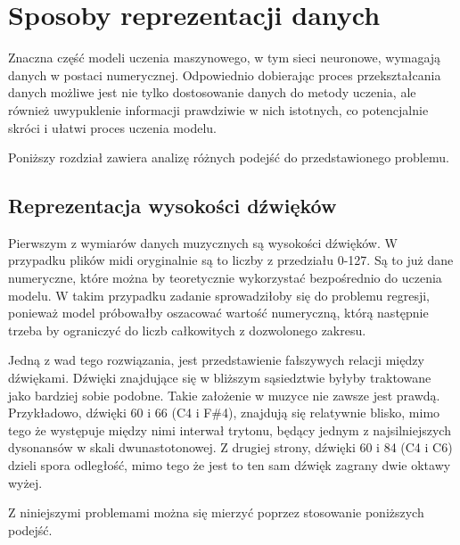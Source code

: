 \chapter{Sposoby reprezentacji danych}\label{chap:representation}
{
    Znaczna część modeli uczenia maszynowego, w\,\,tym sieci neuronowe, wymagają 
    danych w\,\,postaci numerycznej. Odpowiednio dobierając proces przekształcania danych
    możliwe jest nie tylko dostosowanie danych do metody uczenia, ale również
    uwypuklenie informacji prawdziwie w\,\,nich istotnych, co potencjalnie skróci i\,\,ułatwi proces uczenia modelu.

    Poniższy rozdział zawiera analizę różnych podejść do przedstawionego problemu.

    \section{Reprezentacja wysokości dźwięków}
    {
        Pierwszym z\,\,wymiarów danych muzycznych są wysokości dźwięków. W\,\,przypadku plików midi
        oryginalnie są to liczby z\,\,przedziału 0-127. Są to już dane numeryczne, które
        można by teoretycznie wykorzystać bezpośrednio do uczenia modelu.
        W\,\,takim przypadku zadanie sprowadziłoby się do problemu regresji, ponieważ model próbowałby
        oszacować wartość numeryczną, którą następnie trzeba by ograniczyć do liczb całkowitych z\,\,dozwolonego zakresu.

        Jedną z\,\,wad tego rozwiązania, jest przedstawienie fałszywych relacji między dźwiękami.
        Dźwięki znajdujące się w\,\,bliższym sąsiedztwie byłyby traktowane jako bardziej sobie podobne.
        Takie założenie w\,\,muzyce nie zawsze jest prawdą. Przykładowo, dźwięki 60 i\,\,66 (C4 i\,\,F\#4), znajdują się
        relatywnie blisko, mimo tego że występuje między nimi interwał trytonu, będący jednym z\,\,najsilniejszych dysonansów w\,\,skali 
        dwunastotonowej. Z\,\,drugiej strony, dźwięki 60 i\,\,84 (C4 i\,\,C6) dzieli spora odległość, mimo tego że jest to ten sam dźwięk
        zagrany dwie oktawy wyżej.

        Z\,\,niniejszymi problemami można się mierzyć poprzez stosowanie poniższych podejść.

}}
